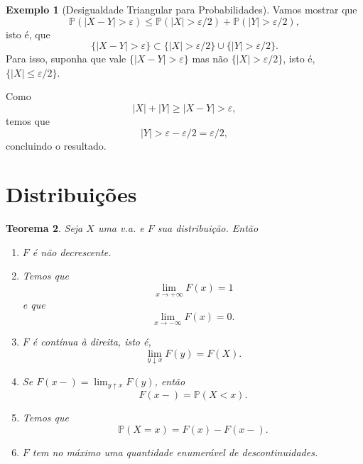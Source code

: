 \documentclass[12pt,a4paper,oneside]{book}
\newtheorem{theorem}{Teorema}[section]
\theoremstyle{definition}
\newtheorem{definition}[theorem]{Defini\c{c}\~ao}
\newtheorem{example}[theorem]{Exemplo}
\theoremstyle{remark}
\numberwithin{equation}{section}
\newcommand{\e}{\varepsilon}
\newcommand{\pr}{\mathbb{P}}
\begin{document}
\begin{tcolorbox}
\begin{example}[Desigualdade Triangular para Probabilidades] Vamos mostrar que
$$\pr(|X-Y|>\e)\leq \pr(|X|>\e/2) +\pr(|Y|>\e/2), $$
isto é, que
$$\{|X-Y|>\e\} \subset \{|X|>\e/2\}\cup \{|Y|>\e/2\}. $$
Para isso, suponha  que vale $\{|X-Y|>\e\}$ mas  não $\{|X|>\e/2\}$, isto é,  $\{|X|\leq\e/2\}$. 

Como
$$|X|+|Y|\geq |X-Y|>  \e, $$ temos que
$$|Y| > \e - \e/2 = \e/2, $$
concluindo o resultado.
\end{example}
\end{tcolorbox}


\newpage


\section{Distribuições}\label{section- distribuicoes}





\begin{theorem} Seja $X$ uma v.a. e $F$ sua distribuição. Então
\begin{enumerate}
\item $F$ é não decrescente.
\item Temos que
$$\lim_{x\rightarrow +\infty} F(x) = 1$$ e que
$$\lim_{x\rightarrow -\infty} F(x) = 0.$$
\item $F$ é contínua à direita, isto é,
$$\lim_{y\downarrow x}F(y) = F(X). $$
\item Se $F(x-) = \lim_{y\uparrow x}F(y)$, então 
$$F(x-) = \pr(X<x). $$ 
\item Temos que
$$ \pr(X=x) = F(x)-F(x-).$$
\item $F$ tem no máximo uma quantidade enumerável de descontinuidades.
\end{enumerate}

\end{theorem}
\end{document}
